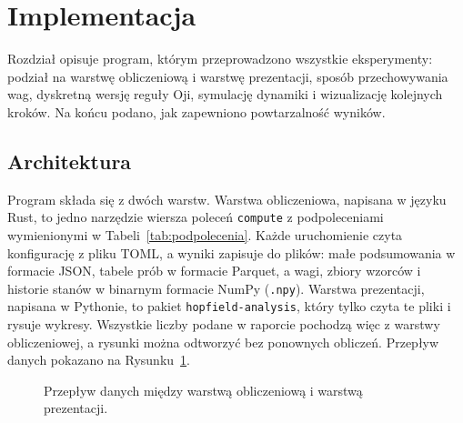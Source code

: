 \section{Implementacja}
\label{sec:implementacja}

Rozdział opisuje program, którym przeprowadzono wszystkie eksperymenty: podział na warstwę obliczeniową i warstwę prezentacji, sposób przechowywania wag, dyskretną wersję reguły Oji, symulację dynamiki i wizualizację kolejnych kroków. Na końcu podano, jak zapewniono powtarzalność wyników.

\subsection{Architektura}
\label{sec:architektura}

Program składa się z dwóch warstw. Warstwa obliczeniowa, napisana w języku Rust, to jedno narzędzie wiersza poleceń \texttt{compute} z podpoleceniami wymienionymi w Tabeli~\ref{tab:podpolecenia}. Każde uruchomienie czyta konfigurację z pliku TOML, a wyniki zapisuje do plików: małe podsumowania w formacie JSON, tabele prób w formacie Parquet, a wagi, zbiory wzorców i historie stanów w binarnym formacie NumPy (\texttt{.npy}). Warstwa prezentacji, napisana w Pythonie, to pakiet \texttt{hopfield-analysis}, który tylko czyta te pliki i rysuje wykresy. Wszystkie liczby podane w raporcie pochodzą więc z warstwy obliczeniowej, a rysunki można odtworzyć bez ponownych obliczeń. Przepływ danych pokazano na Rysunku~\ref{fig:przeplyw}.

\begin{figure}[H]
    \centering
    \ifrysunki
    \fi
    \caption{Przepływ danych między warstwą obliczeniową i warstwą prezentacji.}
    \label{fig:przeplyw}
\end{figure}

